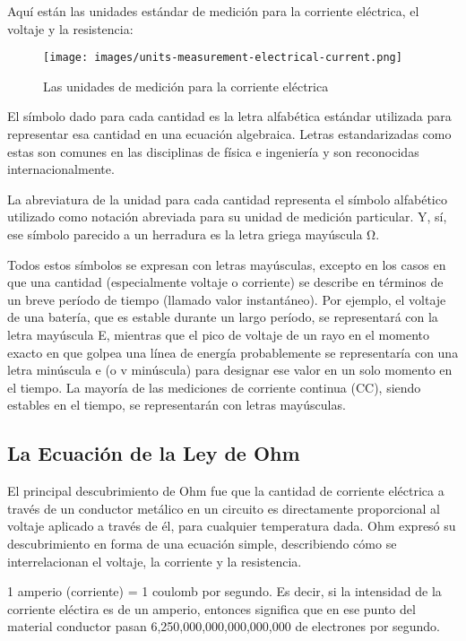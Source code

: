 \documentclass[output=paper, 
colorlinks,
citecolor=brown,
newtxmath
]{langscibook}
\begin{document}
Aquí están las unidades estándar de medición para la corriente eléctrica, el voltaje y la resistencia:

\begin{figure}
\texttt{[image: images/units-measurement-electrical-current.png]}
\caption{Las unidades de medición para la corriente eléctrica}
\label{fig:unidades}
\end{figure}

El símbolo dado para cada cantidad es la letra alfabética estándar utilizada para representar esa cantidad en una ecuación algebraica. Letras estandarizadas como estas son comunes en las disciplinas de física e ingeniería y son reconocidas internacionalmente.

La abreviatura de la unidad para cada cantidad representa el símbolo alfabético utilizado como notación abreviada para su unidad de medición particular. Y, sí, ese símbolo parecido a un herradura es la letra griega mayúscula Ω.

Todos estos símbolos se expresan con letras mayúsculas, excepto en los casos en que una cantidad (especialmente voltaje o corriente) se describe en términos de un breve período de tiempo (llamado valor instantáneo). Por ejemplo, el voltaje de una batería, que es estable durante un largo período, se representará con la letra mayúscula E, mientras que el pico de voltaje de un rayo en el momento exacto en que golpea una línea de energía probablemente se representaría con una letra minúscula e (o v minúscula) para designar ese valor en un solo momento en el tiempo. La mayoría de las mediciones de corriente continua (CC), siendo estables en el tiempo, se representarán con letras mayúsculas.


\subsection{La Ecuación de la Ley de Ohm}
El principal descubrimiento de Ohm fue que la cantidad de corriente eléctrica a través de un conductor metálico en un circuito es directamente proporcional al voltaje aplicado a través de él, para cualquier temperatura dada. Ohm expresó su descubrimiento en forma de una ecuación simple, describiendo cómo se interrelacionan el voltaje, la corriente y la resistencia.

1 amperio (corriente) = 1 coulomb por segundo. Es decir, si la intensidad de la corriente eléctira es de un amperio, entonces significa que en ese punto del material conductor pasan 6,250,000,000,000,000,000 de electrones por segundo. 
\end{document}
